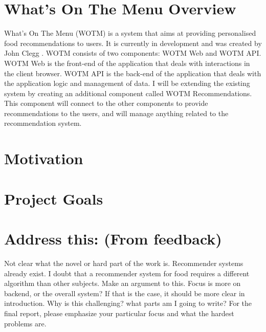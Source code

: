 \section{What's On The Menu Overview}

What's On The Menu (WOTM) is a system that aims at providing personalised food recommendations to users. It is currently in development and was created by John Clegg . WOTM consists of two components: WOTM Web and WOTM API. WOTM Web is the front-end of the application that deals with interactions in the client browser. WOTM API is the back-end of the application that deals with the application logic and management of data. I will be extending the existing system by creating an additional component called WOTM Recommendations. This component will connect to the other components to provide recommendations to the users, and will manage anything related to the recommendation system. 

\section{Motivation}
\section{Project Goals}
\section{Address this: (From feedback)}
Not clear what the novel or hard part of the work is. Recommender systems already exist. I doubt that a recommender system for food requires a different algorithm than other subjects. Make an argument to this.
Focus is more on backend, or the overall system? If that is the case, it should be more clear in introduction. Why is this challenging? 
what parts am I going to write?
For the final report, please emphasize your particular focus and what the hardest problems are. 